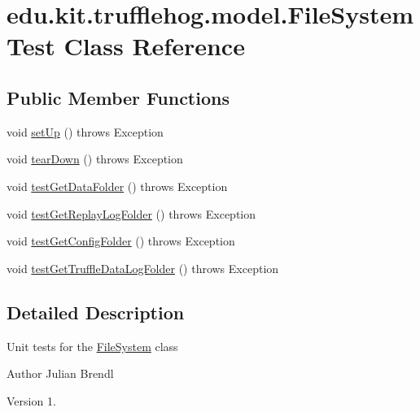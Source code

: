 \hypertarget{classedu_1_1kit_1_1trufflehog_1_1model_1_1_file_system_test}{}\section{edu.\+kit.\+trufflehog.\+model.\+File\+System\+Test Class Reference}
\label{classedu_1_1kit_1_1trufflehog_1_1model_1_1_file_system_test}
\subsection*{Public Member Functions}
\begin{DoxyCompactItemize}
\item 
void \hyperlink{classedu_1_1kit_1_1trufflehog_1_1model_1_1_file_system_test_a18073edc04c9c3fa509d82d4e82ad2cd}{set\+Up} ()  throws Exception 
\item 
void \hyperlink{classedu_1_1kit_1_1trufflehog_1_1model_1_1_file_system_test_a22dd4e1ad942c6e8eefe6cf6e07f8f61}{tear\+Down} ()  throws Exception 
\item 
void \hyperlink{classedu_1_1kit_1_1trufflehog_1_1model_1_1_file_system_test_a8a9391396237a685080090474e09f685}{test\+Get\+Data\+Folder} ()  throws Exception 
\item 
void \hyperlink{classedu_1_1kit_1_1trufflehog_1_1model_1_1_file_system_test_a7a6d2305f8d9b160cc495a03d53c7038}{test\+Get\+Replay\+Log\+Folder} ()  throws Exception 
\item 
void \hyperlink{classedu_1_1kit_1_1trufflehog_1_1model_1_1_file_system_test_a8d0c36ecb9a1fe046d5220101dede65b}{test\+Get\+Config\+Folder} ()  throws Exception 
\item 
void \hyperlink{classedu_1_1kit_1_1trufflehog_1_1model_1_1_file_system_test_a27075c65ee606d3ee8d75af48bb58016}{test\+Get\+Truffle\+Data\+Log\+Folder} ()  throws Exception 
\end{DoxyCompactItemize}


\subsection{Detailed Description}
Unit tests for the \hyperlink{classedu_1_1kit_1_1trufflehog_1_1model_1_1_file_system}{File\+System} class 

\begin{DoxyAuthor}{Author}
Julian Brendl 
\end{DoxyAuthor}
\begin{DoxyVersion}{Version}
1. 
\end{DoxyVersion}


